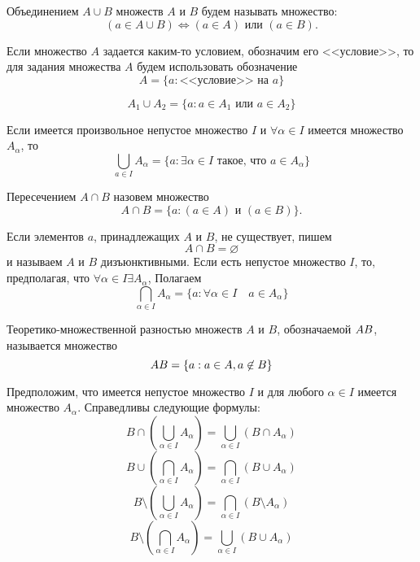 \documentclass[main]{subfiles}
\begin{document}
Объединением $ A \cup B$ множеств $A$ и $B$ будем называть множество:
\[(a \in A \cup B) \Leftrightarrow (a \in A) \text{ или } (a \in B).\]

Если множество $A$ задается каким-то условием, обозначим его <<условие>>,
то для задания множества $A$ будем использовать обозначение
\[A=\{a:\text{<<условие>> на } a\}\]
\begin{case}
    \[A_1 \cup A_2 = \{a: a \in A_1 \text{ или } a \in A_2\} \]
\end{case}

Если имеется произвольное непустое множество $I$ и $\forall \alpha \in I$
имеется множество $A_\alpha$, то
\[\bigcup_{a \in I} A_\alpha = \{a: \exists \alpha \in I \text{ такое, что } a \in A_\alpha\}\]

Пересечением $A \cap B$ назовем множество
\[A \cap B = \{a: (a \in A) \text{ и } (a \in B)\}.\]

Если элементов $a$, принадлежащих $A$ и $B$, не существует, пишем
\[A \cap B = \varnothing\]
и называем $A$ и $B$ дизъюнктивными. Если есть непустое множество $I$,
то, предполагая, что $\forall\alpha\in I \exists A_\alpha$, Полагаем
\[\bigcap_{\alpha\in I} A_\alpha = \{a: \forall \alpha \in I \quad a \in A_\alpha\}\]

Теоретико-множественной разностью множеств $A$ и $B$, обозначаемой $A \\ B$,
называется множество
\[A \\ B = \{a: a\in A, a \not\in B\}\]

\begin{theorem}
    Предположим, что имеется непустое множество $I$ и для любого $\alpha \in I$
    имеется множество $A_\alpha$. Справедливы следующие формулы:
    \begin{equation}
        \label{thm:1.1}
        B \cap \left( \bigcup_{\alpha \in I} A_\alpha \right) =
        \bigcup_{\alpha \in I} (B \cap A_\alpha)
    \end{equation}
    \begin{equation}
        B \cup \left( \bigcap_{\alpha \in I} A_\alpha \right) =
        \bigcap_{\alpha \in I} (B \cup A_\alpha)
    \end{equation}
    \begin{equation}
        B \setminus \left( \bigcup_{\alpha \in I} A_\alpha \right) =
        \bigcap_{\alpha \in I} (B \setminus A_\alpha)
    \end{equation}
    \begin{equation}
        B \setminus \left( \bigcap_{\alpha \in I} A_\alpha \right) =
        \bigcup_{\alpha \in I} (B \cup A_\alpha)
    \end{equation}
\end{theorem}
\end{document}

